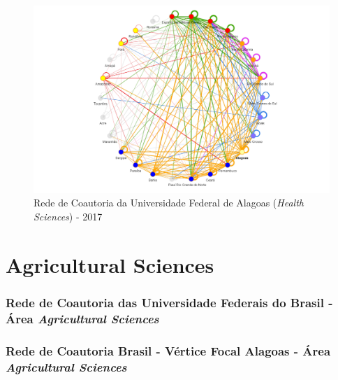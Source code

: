 \begin{figure}[H]
	\centering
	\includegraphics[scale=0.6]{Imagens/rede-al-2017.pdf}
	\caption{Rede de Coautoria da Universidade Federal de Alagoas (\textit{Health Sciences}) - 2017}
	\label{Rede de Coautoria - UF AL 2017}
\end{figure}




\section{\textbf{Agricultural Sciences}}

\subsubsection{Rede de Coautoria das Universidade Federais do Brasil - Área \textit{Agricultural Sciences}}

\subsubsection{Rede de Coautoria Brasil - Vértice Focal Alagoas - Área \textit{Agricultural Sciences}}


